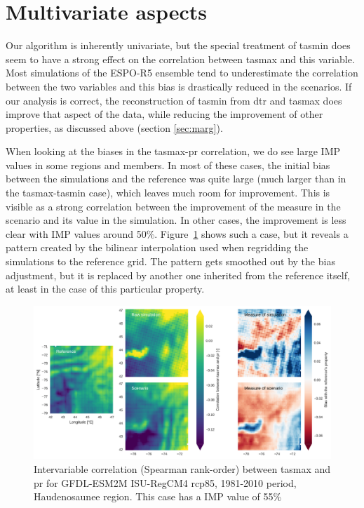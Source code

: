 \documentclass[letterpaper,10pt]{article}
\begin{document}
\section{Multivariate aspects}
Our algorithm is inherently univariate, but the special treatment of tasmin does seem to have a strong effect on the correlation between tasmax and this variable.
Most simulations of the ESPO-R5 ensemble tend to underestimate the correlation between the two variables and this bias is drastically reduced in the scenarios.
If our analysis is correct, the reconstruction of tasmin from dtr and tasmax does improve that aspect of the data, while reducing the improvement of other properties, as discussed above (section \ref{sec:marg}).

When looking at the biases in the tasmax-pr correlation, we do see large IMP values in some regions and members.
In most of these cases, the initial bias between the simulations and the reference was quite large (much larger than in the tasmax-tasmin case), which leaves much room for improvement.
This is visible as a strong correlation between the improvement of the measure in the scenario and its value in the simulation.
In other cases, the improvement is less clear with IMP values around 50\%.
Figure~\ref{fig:icorr} shows such a case, but it reveals a pattern created by the bilinear interpolation used when regridding the simulations to the reference grid.
The pattern gets smoothed out by the bias adjustment, but it is replaced by another one inherited from the reference itself, at least in the case of this particular property.

\begin{figure}
    \centering
    \includegraphics[width=\textwidth]{../images/corr_tasmax_pr_diags.pdf}
    \caption{Intervariable correlation (Spearman rank-order) between tasmax and pr for GFDL-ESM2M ISU-RegCM4 rcp85, 1981-2010 period, Haudenosaunee region. This case has a IMP value of 55\%}\label{fig:icorr}
\end{figure}
\end{document}
